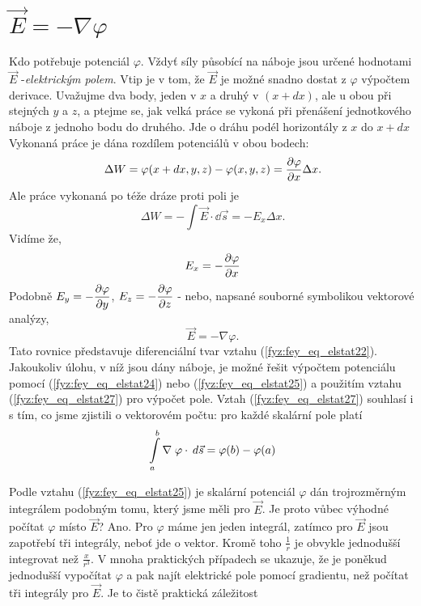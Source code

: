 {  \section{\texorpdfstring{\(\vec{E} = -\nabla\varphi\)}{Gradient potenciálu}}\label{fyz:IIchapIVsecIV}
    \cite[s.~70]{Feynman02} Kdo potřebuje potenciál \(\varphi\). Vždyť síly působící na náboje jsou 
    určené hodnotami \(\vec{E}\) -\emph{elektrickým polem}. Vtip je v tom, že \(\vec{E}\) je možné 
    snadno dostat z \(\varphi\) výpočtem derivace. Uvažujme dva body, jeden v \(x\) a druhý v \((x 
    + dx)\), ale u obou při stejných \(y\) a \(z\), a ptejme se, jak velká práce se vykoná při 
    přenášení jednotkového náboje z jednoho bodu do druhého. Jde o dráhu podél 	horizontály z \(x\) 
    do \(x + dx\) Vykonaná práce je dána rozdílem potenciálů v obou bodech:
    \begin{equation*}
     \Delta W = \varphi(x+dx, y, z) - \varphi(x, y, z) = \dfrac{\partial \varphi}{\partial x}\Delta x.
    \end{equation*}
    Ale práce vykonaná po téže dráze proti poli je
    \begin{equation*}
     \Delta W = - \int\vec{E}\cdot\dd{\vec{s}} = - E_x \Delta x.
    \end{equation*}
    Vidíme že,
    \begin{equation}\label{fyz:fey_eq_elstat26}
    E_x = -\dfrac{\partial \varphi}{\partial x}
    \end{equation}
    Podobně \(E_y = -\dfrac{\partial \varphi}{\partial y}\), \(E_z = -\dfrac{\partial \varphi}{\partial z}\) - nebo, napsané souborné 
    symbolikou vektorové analýzy,
    \begin{equation}\label{fyz:fey_eq_elstat27}
    \vec{E} = -\nabla\varphi.
    \end{equation}    
    Tato rovnice představuje diferenciální tvar vztahu (\ref{fyz:fey_eq_elstat22}). Jakoukoliv 
    úlohu, v níž jsou dány náboje, je možné řešit výpočtem potenciálu pomocí 
    (\ref{fyz:fey_eq_elstat24}) nebo (\ref{fyz:fey_eq_elstat25}) a použitím vztahu 
    (\ref{fyz:fey_eq_elstat27}) pro výpočet pole. Vztah (\ref{fyz:fey_eq_elstat27}) souhlasí i s 
    tím, co jsme zjistili o vektorovém počtu: pro každé skalární pole platí
    \begin{equation}\label{fyz:fey_eq_elstat28}
     \int\limits_{a}^{b}\nabla\;\varphi\cdot\hspace{2pt}d\vec{s} = \varphi(b) - \varphi(a)
    \end{equation}     
    
    Podle vztahu (\ref{fyz:fey_eq_elstat25}) je skalární potenciál \(\varphi\) dán trojrozměrným 
    integrálem podobným tomu, který jsme měli pro \(\vec{E}\). Je proto vůbec výhodné počítat 
    \(\varphi\) místo \(\vec{E}\)? Ano. Pro \(\varphi\) máme jen jeden integrál, zatímco pro 
    \(\vec{E}\) jsou zapotřebí tři integrály, neboť jde o vektor. Kromě toho \(\frac{1}{r}\) je 
    obvykle jednodušší integrovat než \(\frac{x}{r^3}\). V mnoha praktických případech se ukazuje, 
    že je poněkud jednodušší vypočítat \(\varphi\) a pak najít elektrické pole pomocí gradientu, 
    než počítat tři integrály pro \(\vec{E}\). Je to čistě praktická záležitost
    
}
